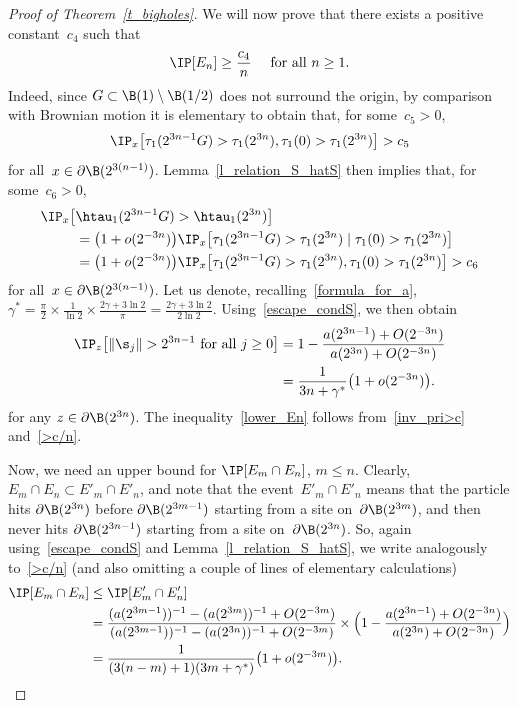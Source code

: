\begin{proof}[Proof of Theorem~\ref{t_bigholes}]
We will now prove that there exists a positive constant~$c_4$ such that
\begin{equation}\label{lower_En}
\IP[E_n] \geq \frac{c_4}{n} \quad \text{ for all }n\geq 1.
\end{equation}
Indeed, since $G\subset\B(1)\setminus \B(1/2)$ does not surround the origin, by comparison with Brownian motion it is elementary to obtain that, for some~$c_5>0$,
\[
\IP_x\big[\tau_1(2^{3n-1}G)>\tau_1(2^{3n}),
\tau_1(0)>\tau_1(2^{3n}) \big] > c_5
\]
for all~$x\in\partial \B(2^{3(n-1)})$. Lemma~\ref{l_relation_S_hatS} then implies that, for some~$c_6>0$,
\begin{align}
\IP_x\big[&\htau_1(2^{3n-1}G)>\htau_1(2^{3n})\big]\nonumber\\
&= \big(1+o(2^{-3n})\big)
\IP_x\big[\tau_1(2^{3n-1}G)>\tau_1(2^{3n})
\mid \tau_1(0)>\tau_1(2^{3n})\big] \nonumber\\
&= \big(1+o(2^{-3n})\big)
\IP_x\big[\tau_1(2^{3n-1}G)>\tau_1(2^{3n}),
\tau_1(0)>\tau_1(2^{3n})\big] > c_6\label{inv_pri>c}
\end{align}
for all~$x\in\partial \B(2^{3(n-1)})$. Let us denote, recalling~\eqref{formula_for_a}, $\gamma^{*}=\frac{\pi}{2}\times\frac{1}{\ln 2} \times
\frac{2\gamma+ 3\ln 2}{\pi} =\frac{2\gamma+ 3\ln 2}{2\ln 2}$. Using~\eqref{escape_condS}, we then obtain
\begin{align}
\IP_z\big[\|\s_j\| > 2^{3n-1} \text{ for all } j\geq 0\big] & = 1- \frac{a(2^{3n-1})+O(2^{-3n})}{a(2^{3n})+O(2^{-3n})}
\nonumber\\
&= \frac{1}{3n+\gamma^{*}}\big(1+o(2^{-3n})\big).\label{>c/n}
\end{align}
for any $z\in\partial \B(2^{3n})$. The inequality~\eqref{lower_En} follows from~\eqref{inv_pri>c} and~\eqref{>c/n}.

Now, we need an upper bound for $\IP[E_m\cap E_n]$, $m\leq n$. Clearly, $E_m \cap E_n\subset E'_m \cap E'_n$, and note that the event~$E'_m \cap E'_n$ means that the particle hits $\partial\B(2^{3n})$ before $\partial\B(2^{3m-1})$ starting from a site on~$\partial\B(2^{3m})$, and then never hits $\partial\B(2^{3n-1})$ starting from a site on~$\partial\B(2^{3n})$. So, again using~\eqref{escape_condS} and Lemma~\ref{l_relation_S_hatS}, we write analogously to~\eqref{>c/n} (and also omitting a couple of lines of elementary calculations)
\begin{align}
\IP[E_m \cap E_n] & \leq \IP[E'_m \cap E'_n]\nonumber\\
& = \frac{(a(2^{3m-1}))^{-1}-(a(2^{3m}))^{-1}+O(2^{-3m})} {(a(2^{3m-1}))^{-1}-(a(2^{3n}))^{-1}+O(2^{-3m})}
\times \Big(1- \frac{a(2^{3n-1})+O(2^{-3n})}{a(2^{3n})+O(2^{-3n})}\Big)
\nonumber\\
& = \frac{1}{(3(n-m)+1)(3m+\gamma^{*})}\big(1+o(2^{-3m})\big).\label{EmEn_upper}
\end{align}


\end{proof}
